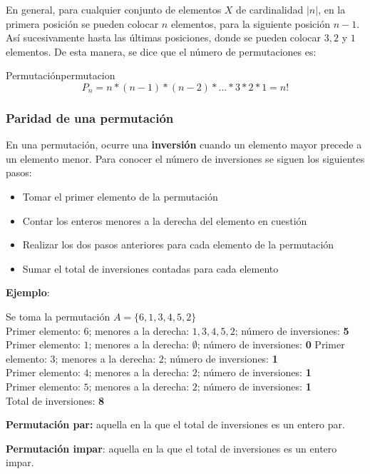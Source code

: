 En general, para cualquier conjunto de elementos $X$ de cardinalidad $|n|$, en
la primera posici\'on se pueden colocar $n$ elementos, para la siguiente
posici\'on $n-1$. Así sucesivamente hasta las \'ultimas posiciones, donde se
pueden colocar $3, 2$ y $1$ elementos. De esta manera, se dice que el n\'umero
de permutaciones es:

\begin{theorem}{Permutación}{permutacion}
	\begin{equation}
		P_n=n*(n-1)*(n-2)*...*3*2*1=n!
		\label{permutaciones_totales}
	\end{equation}
\end{theorem}

\subsubsection{Paridad de una permutación}

En una permutación, ocurre una \textbf{inversi\'on} cuando un elemento mayor
precede a un elemento menor. Para conocer el n\'umero de inversiones se siguen
los siguientes pasos:

\begin{itemize}
\item Tomar el primer elemento de la permutaci\'on
\item Contar los enteros menores a la derecha del elemento en cuesti\'on
\item Realizar los dos pasos anteriores para cada elemento de la permutaci\'on
\item Sumar el total de inversiones contadas para cada elemento
\end{itemize}

\textbf{Ejemplo}:

Se toma la permutación \textbf{$A=\{6,1,3,4,5,2\}$}\\

Primer elemento: $6$; menores a la derecha: $1,3,4,5,2$; n\'umero de
inversiones: \textbf{5}
Primer elemento: $1$; menores a la derecha: $\emptyset$; n\'umero de
inversiones: \textbf{0}
Primer elemento: $3$; menores a la derecha: $2$; n\'umero de inversiones:
\textbf{1}\\
Primer elemento: $4$; menores a la derecha: $2$; n\'umero de inversiones:
\textbf{1}\\
Primer elemento: $5$; menores a la derecha: $2$; n\'umero de inversiones:
\textbf{1}\\

Total de inversiones: \textbf{8}
\begin{tcolorbox}[colback=blue!5!white,colframe=blue!60!black,title=Definición: Tipos de permutaciones]
	\textbf{Permutaci\'on par:} aquella en la que el total de inversiones es un
	entero par.
	
	\tcblower

	\textbf{Permutaci\'on impar}: aquella en la que el total de inversiones es un
	entero impar.
	
\end{tcolorbox}


